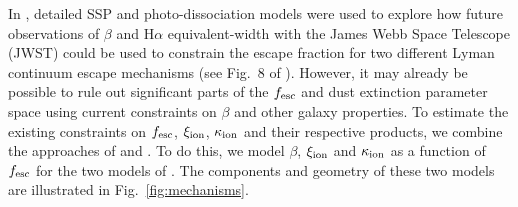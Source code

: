 In \citet{Zackrisson:2013iz}, detailed SSP and photo-dissociation models were used to explore how future observations of $\beta$ and H$\alpha$ equivalent-width with the James Webb Space Telescope (JWST) could be used to constrain the escape fraction for two different Lyman continuum escape mechanisms (see Fig.~8 of \citet{Zackrisson:2013iz}). However, it may already be possible to rule out significant parts of the $f_{\rm{esc}}$ and dust extinction parameter space using current constraints on $\beta$ and other galaxy properties. To estimate the existing constraints on $f_{\rm{esc}}$, $\xi_{\rm{ion}}$, $\kappa_{\rm{ion}}$ and their respective products, we combine the approaches of \citet{Zackrisson:2013iz} and \citet{2010Natur.468...49R, Robertson:2013ji}. To do this, we model $\beta$, $\xi_{\rm{ion}}$ and $\kappa_{\rm{ion}}$ as a function of $f_{\rm{esc}}$ for the two models of \citet{Zackrisson:2013iz}. The components and geometry of these two models are illustrated in Fig.~\ref{fig:mechanisms}.

